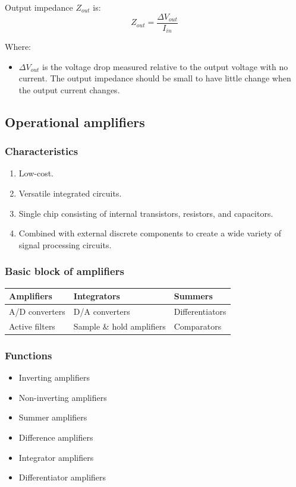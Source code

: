 \documentclass[11pt]{article}
\begin{document}
Output impedance \(Z_{out}\) is:
\[Z_{out} = \frac{\Delta V_{out}}{I_{in}}\]

Where:
\begin{itemize}
\item \(\Delta V_{out}\) is the voltage drop measured relative to the output voltage with no current. The output impedance should be small to have little change when the output current changes.
\end{itemize}
\subsection{Operational amplifiers}
\label{sec:org6c9b8af}

\subsubsection{Characteristics}
\label{sec:org720a148}
\begin{enumerate}
\item Low-cost.
\item Versatile integrated circuits.
\item Single chip consisting of internal transistors, resistors, and capacitors.
\item Combined with external discrete components to create a wide variety of signal processing circuits.
\end{enumerate}
\subsubsection{Basic block of amplifiers}
\label{sec:org53aed37}
\begin{center}
\begin{tabular}{l|l|l}
Amplifiers & Integrators & Summers\\
\hline
A/D converters & D/A converters & Differentiators\\
Active filters & Sample \& hold amplifiers & Comparators\\
\end{tabular}
\end{center}

 \newpage
\subsubsection{Functions}
\label{sec:orge8ff33a}
\begin{itemize}
\item Inverting amplifiers
\item Non-inverting amplifiers
\item Summer amplifiers
\item Difference amplifiers
\item Integrator amplifiers
\item Differentiator amplifiers
\end{itemize}
\end{document}
